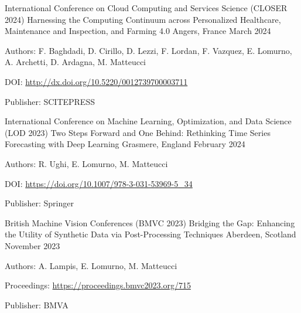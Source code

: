 \begin{cventries}
    \vspace{2mm}
    \cventry
        {International Conference on Cloud Computing and Services Science (CLOSER 2024)}
        {Harnessing the Computing Continuum across Personalized Healthcare, Maintenance and Inspection, and Farming 4.0}
        {Angers, France}
        {March 2024}
        {
        \begin{cvitems}
            \item {Authors: F. Baghdadi, D. Cirillo, D. Lezzi, F. Lordan, F. Vazquez, E. Lomurno, A. Archetti, D. Ardagna, M. Matteucci}
            \item {DOI: \url{http://dx.doi.org/10.5220/0012739700003711}}
            \item {Publisher: SCITEPRESS}
        \end{cvitems}
        }

    \vspace{2mm}
    \cventry
        {International Conference on Machine Learning, Optimization, and Data Science (LOD 2023)}
        {Two Steps Forward and One Behind: Rethinking Time Series Forecasting with Deep Learning}
        {Grasmere, England}
        {February 2024}
        {
        \begin{cvitems}
            \item {Authors: R. Ughi, E. Lomurno, M. Matteucci}
            \item {DOI: \url{https://doi.org/10.1007/978-3-031-53969-5_34}}
            \item {Publisher: Springer}
        \end{cvitems}
        }

    \vspace{2mm}
    \cventry
        {British Machine Vision Conferences (BMVC 2023)}
        {Bridging the Gap: Enhancing the Utility of Synthetic Data via Post-Processing Techniques}
        {Aberdeen, Scotland}
        {November 2023}
        {
        \begin{cvitems}
            \item {Authors: A. Lampis, E. Lomurno, M. Matteucci}
            \item {Proceedings: \url{https://proceedings.bmvc2023.org/715}}
            \item {Publisher: BMVA}
        \end{cvitems}
        }


\end{cventries}
